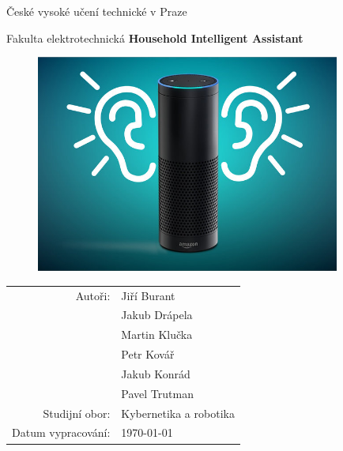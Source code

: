 \documentclass[12pt,a4paper]{article}
\author{Jakub Drápela}
\begin{document}
\pagestyle{empty}


	\begin{center}

\large

České vysoké učení technické v Praze

\medskip

Fakulta elektrotechnická 
\vfill
\vfill
{\LARGE\bfseries Household Intelligent Assistant}


\vspace{9mm}

\begin{figure}[h!]
\begin{center}
\includegraphics[width = 10cm]{ucho.jpg} 
\end{center}
\end{figure}

\vspace{9mm}

\begin{tabular}{rl}

Autoři: & Jiří Burant \\
\noalign{\vspace{1mm}}
		& Jakub Drápela \\
		\noalign{\vspace{1mm}}
		& Martin Klučka\\
		\noalign{\vspace{1mm}}
		& Petr Kovář \\
		\noalign{\vspace{1mm}}
		& Jakub Konrád\\
		\noalign{\vspace{1mm}}
		& Pavel Trutman\\
\noalign{\vspace{2mm}}
Studijní obor: & Kybernetika a robotika \\
\noalign{\vspace{2mm}}
Datum vypracování: & \today\\
\end{tabular}

\end{center}
\end{document}
